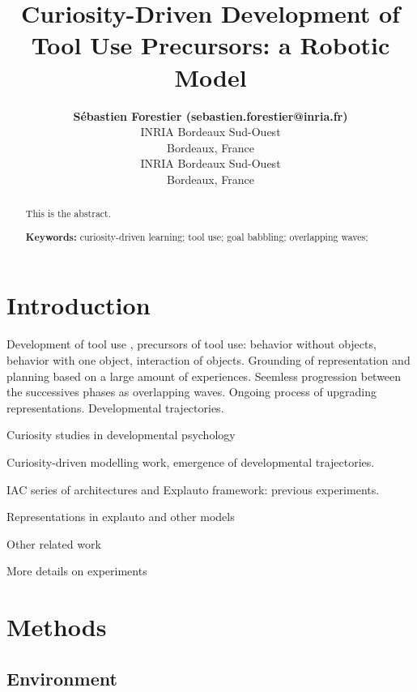 \documentclass[10pt,letterpaper]{article}
\title{Curiosity-Driven Development of Tool Use Precursors: a Robotic Model}
\author{{\large \bf S\'ebastien Forestier (sebastien.forestier@inria.fr)} \\
	INRIA Bordeaux Sud-Ouest\\
	Bordeaux, France
  \AND {\large \bf Pierre-Yves Oudeyer (pierre-yves.oudeyer@inria.fr)} \\
	INRIA Bordeaux Sud-Ouest\\
	Bordeaux, France}
\begin{document}
\maketitle


\begin{abstract}
This is the abstract.

\textbf{Keywords:} 
curiosity-driven learning; tool use; goal babbling; overlapping waves; 
\end{abstract}


\section{Introduction}

	Development of tool use \cite{guerin2013survey}, precursors of tool use: behavior without objects, behavior with one object, interaction of objects.	
	Grounding of representation and planning based on a large amount of experiences. 	
	Seemless progression between the successives phases as overlapping waves. 	
	Ongoing process of upgrading representations.	
	Developmental trajectories.
	
	
	Curiosity studies in developmental psychology 
	\cite{kidd}
	\cite{gottlieb_information-seeking_2013}
	
	Curiosity-driven modelling work, emergence of developmental trajectories.
	\cite{oudeyer_intrinsic_2007} 
	\cite{oudeyer_what_2007}
	\cite{flow}
	\cite{sch}
	\cite{santucci2013}
	\cite{cangelosi2010integration}
	\cite{oudeyer2014evolution}
	
	
	IAC series of architectures and Explauto framework: previous experiments.
	\cite{moulin-frier_self-organization_2014}
	\cite{moulin-frier_explauto:_2014}
	\cite{baranes2010intrinsically}
	\cite{riac}
	\cite{baranes_active_2013}
	
	Representations in explauto and other models 
	\cite{mugan2009}
	\cite{metzen2013}
	\cite{horde}
	\cite{mugan}
	\cite{vig}
	\cite{sutton1999between}
	
	Other related work
	\cite{ugur2015}
	\cite{schmerlinggoal}

	More details on experiments
	\cite{ijspeert_dynamical_2013}
	
	\cite{}
	
%

\section{Methods}

	\subsection{Environment}
	
\end{document}
